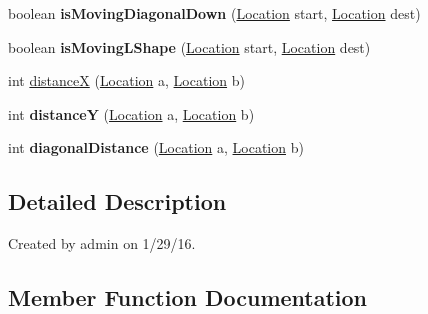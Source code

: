 \begin{DoxyCompactItemize}
\item 
boolean {\bfseries is\+Moving\+Diagonal\+Down} (\hyperlink{class_chess_pieces_1_1_location}{Location} start, \hyperlink{class_chess_pieces_1_1_location}{Location} dest)\hypertarget{class_chess_pieces_1_1_movement_a6a310ab23c4746fa61cd9c31fc2d9b3f}{}\label{class_chess_pieces_1_1_movement_a6a310ab23c4746fa61cd9c31fc2d9b3f}

\item 
boolean {\bfseries is\+Moving\+L\+Shape} (\hyperlink{class_chess_pieces_1_1_location}{Location} start, \hyperlink{class_chess_pieces_1_1_location}{Location} dest)\hypertarget{class_chess_pieces_1_1_movement_a76497ccb6c29ec027f31094d616fd746}{}\label{class_chess_pieces_1_1_movement_a76497ccb6c29ec027f31094d616fd746}

\item 
int \hyperlink{class_chess_pieces_1_1_movement_a110c9a7e3dc203d0d8d9df9082ae7354}{distanceX} (\hyperlink{class_chess_pieces_1_1_location}{Location} a, \hyperlink{class_chess_pieces_1_1_location}{Location} b)
\item 
int {\bfseries distanceY} (\hyperlink{class_chess_pieces_1_1_location}{Location} a, \hyperlink{class_chess_pieces_1_1_location}{Location} b)\hypertarget{class_chess_pieces_1_1_movement_aeae82b77b5df0070d6f8a7233b4061cb}{}\label{class_chess_pieces_1_1_movement_aeae82b77b5df0070d6f8a7233b4061cb}

\item 
int {\bfseries diagonal\+Distance} (\hyperlink{class_chess_pieces_1_1_location}{Location} a, \hyperlink{class_chess_pieces_1_1_location}{Location} b)\hypertarget{class_chess_pieces_1_1_movement_a01771d2c3b69685318aa7632cd285f89}{}\label{class_chess_pieces_1_1_movement_a01771d2c3b69685318aa7632cd285f89}

\end{DoxyCompactItemize}


\subsection{Detailed Description}
Created by admin on 1/29/16. 

\subsection{Member Function Documentation}
